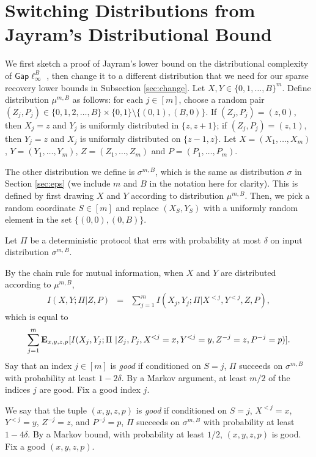 \documentclass[twoside,leqno,twocolumn]{article}
\newcommand{\gaplinf}{\mathsf{Gap}\ell_{\infty}}
\begin{document}
\section{Switching Distributions from Jayram's Distributional Bound}\label{app:dist}
We first sketch a proof of Jayram's lower bound on the distributional
complexity of $\gaplinf^B$ \cite{J02}, then change it to a different distribution that
we need for our sparse recovery lower bounds in Subsection \ref{sec:change}. Let 
$X, Y \in \{0, 1, \ldots, B\}^m$. Define distribution
$\mu^{m,B}$ as follows: for each $j \in
[m]$, choose a random pair $(Z_j, P_j) \in \{0, 1, 2, \ldots, B\} \times \{0,1\}
\setminus \{(0,1), (B, 0)\}$. If $(Z_j, P_j) = (z, 0)$, then $X_j = z$ and 
$Y_j$ is uniformly distributed in $\{z, z+1\}$; if $(Z_j, P_j) = (z, 1)$, then $Y_j = z$
and $X_j$ is uniformly distributed on $\{z-1, z\}$. 
Let $X = (X_1, \ldots, X_m)$, $Y = (Y_1, \ldots, Y_m)$, $Z = (Z_1, \ldots, Z_m)$ and $P = (P_1, \ldots, P_m)$. 

The other distribution we define is $\sigma^{m,B}$, 
which is the same as distribution $\sigma$ 
in Section \ref{sec:eps} (we include $m$ and $B$ in the
notation here for clarity). This is defined by
first drawing $X$ and $Y$ according to distribution $\mu^{m,B}$. Then, 
we pick a random coordinate $S \in [m]$ and replace
$(X_S, Y_S)$ with a uniformly random element in the set $\{(0,0), (0,B)\}$. 

Let $\Pi$ be a deterministic protocol that errs with probability at most $\delta$
on input distribution $\sigma^{m,B}$. 

By the chain rule for mutual information, when $X$ and $Y$ are
distributed according to $\mu^{m,B}$, 
\begin{eqnarray*}
I(X, Y ; \Pi | Z, P)
& = & \sum_{j=1}^m I(X_j, Y_j ; \Pi | X^{<j}, Y^{<j}, Z, P),
\end{eqnarray*}
which is equal to 
\begin{eqnarray*}
\sum_{j=1}^m {\bf E}_{x, y, z,p} [I(X_j, Y_j ; \Pi \ |
Z_j, P_j, X^{<j} = x, Y^{<j} = y, Z^{-j} = z, P^{-j} = p)].
\end{eqnarray*}
Say that an index $j \in [m]$ is {\it good} if conditioned on $S=j$,
$\Pi$ succeeds on $\sigma^{m,B}$ with probability at least $1-2\delta$.
By a Markov argument, at least $m/2$ of the indices $j$ are good. 
Fix a good index $j$. 

We say that the tuple $(x, y, z, p)$ is {\it good} if conditioned on $S = j$,
$X^{<j} = x$, $Y^{<j} = y$, $Z^{-j} = z$, and $P^{-j} = p$, $\Pi$ succeeds on $\sigma^{m,B}$
with probability at least $1-4\delta$. By a Markov bound, with probability
at least $1/2$, $(x, y, z, p)$ is good. Fix a good $(x,y,z,p)$.
\end{document}
